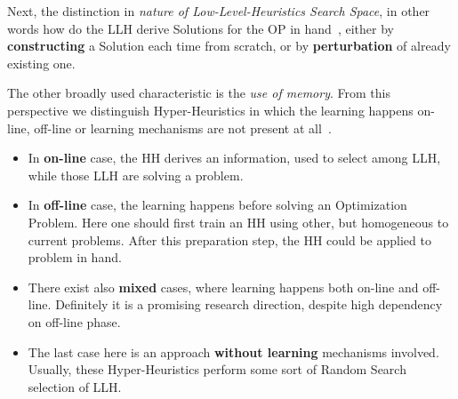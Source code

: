 Next, the distinction in \textit{nature of Low-Level-Heuristics Search Space}, in other words how do the LLH derive Solutions for the OP in hand~\cite{burke2013hyper,burke2019classification,drake2019recent}, either by \textbf{constructing} a Solution each time from scratch, or by \textbf{perturbation} of already existing one.


The other broadly used characteristic is the \textit{use of memory}. From this perspective we distinguish Hyper-Heuristics in which the learning happens on-line, off-line or learning mechanisms are not present at all~\cite{ryser2014review,burke2019classification}.
\begin{itemize}
	\item In \textbf{on-line} case, the HH derives an information, used to select among LLH, while those LLH are solving a problem.

	\item In \textbf{off-line} case, the learning happens before solving an Optimization Problem. Here one should first train an HH using other, but homogeneous to current problems. After this preparation step, the HH could be applied to problem in hand.

	\item There exist also \textbf{mixed} cases, where learning happens both on-line and off-line. Definitely it is a promising research direction, despite high dependency on off-line phase.
	
	\item The last case here is an approach \textbf{without learning} mechanisms involved. Usually, these Hyper-Heuristics perform some sort of Random Search selection of LLH.
\end{itemize}


